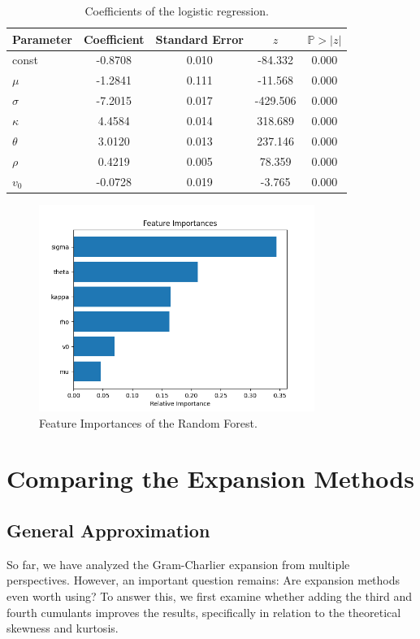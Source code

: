 \begin{table}
    \centering
    \begin{tabular}{l|c|c|c|c}
        \textbf{Parameter} & \textbf{Coefficient} & \textbf{Standard Error} & $z$ & $\mathbb{P}>\vert z\vert$ \\
        \hline
        const & -0.8708 & 0.010 & -84.332 & 0.000 \\
        $\mu$ & -1.2841 & 0.111 & -11.568 & 0.000 \\
        $\sigma$ & -7.2015 & 0.017 & -429.506 & 0.000 \\
        $\kappa$ & 4.4584 & 0.014 & 318.689 & 0.000 \\
        $\theta$ & 3.0120 & 0.013 & 237.146 & 0.000 \\
        $\rho$ & 0.4219 & 0.005 & 78.359 & 0.000 \\
        $v_0$ & -0.0728 & 0.019 & -3.765 & 0.000
    \end{tabular}
    \caption{Coefficients of the logistic regression.}
    \label{tab:logistic_regression_coefficients}
\end{table}

\begin{figure}
    \centering
    \includegraphics[width=0.8\textwidth]{img/feature_importances.png}
    \caption{Feature Importances of the Random Forest.}
    \label{fig:feature_importances}
\end{figure}

\section{Comparing the Expansion Methods}

\subsection{General Approximation}
So far, we have analyzed the Gram-Charlier expansion from multiple perspectives. However, an important question remains: Are expansion methods even worth using? To answer this, we first examine whether adding the third and fourth cumulants improves the results, specifically in relation to the theoretical skewness and kurtosis.

